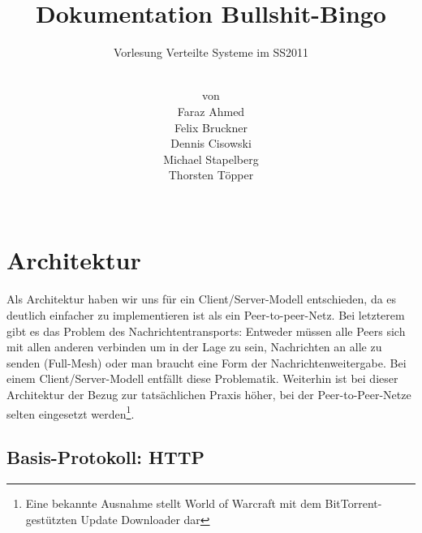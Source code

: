 \documentclass[12pt, a4paper]{scrartcl}
\begin{document}
\pagestyle{fancy}
\newcommand{\np}{\bigskip\noindent}

\setlength{\parindent}{0pt}

\lstset{%
	basicstyle=\small\ttfamily,%
	showstringspaces=false,%
	frame=single,%
}


\author{\\
von\\
Faraz Ahmed\\
Felix Bruckner\\
Dennis Cisowski\\
Michael Stapelberg\\
Thorsten Töpper\\
~}
\title{Dokumentation Bullshit-Bingo}
\subtitle{Vorlesung Verteilte Systeme im SS2011}

\maketitle
\clearpage

\tableofcontents

\clearpage
\section{Architektur}

Als Architektur haben wir uns für ein Client/Server-Modell entschieden, da es
deutlich einfacher zu implementieren ist als ein Peer-to-peer-Netz. Bei
letzterem gibt es das Problem des Nachrichtentransports: Entweder müssen alle
Peers sich mit allen anderen verbinden um in der Lage zu sein, Nachrichten an
alle zu senden (Full-Mesh) oder man braucht eine Form der
Nachrichtenweitergabe. Bei einem Client/Server-Modell entfällt diese
Problematik. Weiterhin ist bei dieser Architektur der Bezug zur tatsächlichen
Praxis höher, bei der Peer-to-Peer-Netze selten eingesetzt werden\footnote{Eine
bekannte Ausnahme stellt World of Warcraft mit dem BitTorrent-gestützten Update
Downloader dar}.

\subsection{Basis-Protokoll: HTTP}
\end{document}
